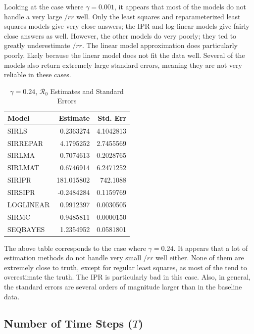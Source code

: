 \message{ !name(draft_v13.tex)}\documentclass[12pt]{article}
\newcommand{\rr}{\ensuremath{\mathcal{R}_0}}
\begin{document}
Looking at the case where $\gamma = 0.001$, it appears that most of the models do not handle a very large $/rr$ well. Only the least squares and reparameterized least squares models give very close answers; the IPR and log-linear models give fairly close answers as well. However, the other models do very poorly; they ted to greatly underestimate $/rr$. The linear model approximation does particularly poorly, likely because the linear model does not fit the data well. Several of the models also return extremely large standard errors, meaning they are not very reliable in these cases.

\begin{table}[H]
	
	\caption{\label{tab:}$\gamma = 0.24$, $\rr$ Estimates and Standard Errors}
	\centering
	\begin{tabular}[t]{l|r|r}
		\hline
		Model & Estimate & Std. Err\\
		\hline
		SIRLS & 0.2363274 & 4.1042813\\
		\hline
		SIRREPAR & 4.1795252 & 2.7455569\\
		\hline
		SIRLMA &  0.7074613 & 0.2028765 \\
		\hline
		SIRLMAT & 0.6746914 & 6.2471252 \\
		\hline
		SIRIPR & 181.015802 & 742.1088 \\
		\hline
		SIRSIPR & -0.2484284 & 0.1159769 \\
		\hline
		LOGLINEAR & 0.9912397 & 0.0030505\\
		\hline
		SIRMC & 0.9485811 & 0.0000150\\
		\hline
		SEQBAYES & 1.2354952 & 0.0581801\\
		\hline
	\end{tabular}
\end{table}

The above table corresponds to the case where $\gamma = 0.24$. It appears that a lot of estimation methods do not handle very small $/rr$ well either. None of them are extremely close to truth, except for regular least squares, as most of the tend to overestimate the truth. The IPR is particularly bad in this case. Also, in general, the standard errors are several orders of magnitude larger than in the baseline data.


\subsection{Number of Time Steps ($T$)}\label{sec:res-time}
\end{document}
